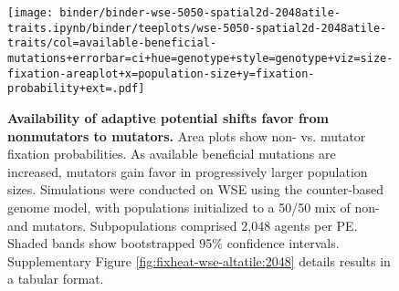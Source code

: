 \begin{figure}

\centering
\texttt{[image: binder/binder-wse-5050-spatial2d-2048atile-traits.ipynb/binder/teeplots/wse-5050-spatial2d-2048atile-traits/col=available-beneficial-mutations+errorbar=ci+hue=genotype+style=genotype+viz=size-fixation-areaplot+x=population-size+y=fixation-probability+ext=.pdf]}%

\caption{
\textbf{Availability of adaptive potential shifts favor from nonmutators to mutators.}
\footnotesize
Area plots show non- vs. mutator fixation probabilities.
As available beneficial mutations are increased, mutators gain favor in progressively larger population sizes.
Simulations were conducted on WSE using the counter-based genome model, with populations initialized to a 50/50 mix of non- and mutators.
Subpopulations comprised 2,048 agents per PE.
Shaded bands show bootstrapped 95\% confidence intervals.
Supplementary Figure \ref{fig:fixheat-wse-altatile:2048} details results in a tabular format.
}
\label{fig:avail-ben-muts}

\end{figure}
